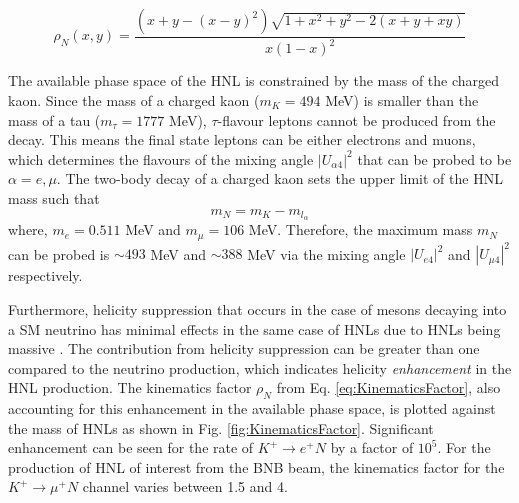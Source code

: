 \begin{equation}
	\rho_{N}(x,y) = \frac{(x+y-(x-y)^{2})\sqrt{1+x^{2}+y^{2}-2(x+y+xy)}}{x(1-x)^{2}}
\label{eq:KinematicsFactor}
\end{equation}


The available phase space of the HNL is constrained by the mass of the charged kaon.
Since the mass of a charged kaon ($m_{K} = 494 $ MeV) is smaller than the mass of a tau ($m_{\tau}=1777 $ MeV), $\tau$-flavour leptons cannot be produced from the decay.  
This means the final state leptons can be either electrons and muons, which determines the flavours of the mixing angle $|U_{\alpha4}|^{2}$ that can be probed to be $\alpha = e, \mu$.
The two-body decay of a charged kaon sets the upper limit of the HNL mass such that
\begin{equation}
	m_{N} = m_{K} - m_{l_{\alpha}}
\end{equation}
where, $m_{e}= 0.511 $ MeV and $m_{\mu}= 106 $ MeV.
Therefore, the maximum mass $m_{N}$ can be probed is $\sim493$ MeV  and $\sim388$ MeV via the mixing angle $|U_{e4}|^{2}$ and $|U_{\mu4}|^{2}$ respectively.

Furthermore, helicity suppression that occurs in the case of mesons decaying into a SM neutrino has minimal effects in the same case of HNLs due to HNLs being massive \cite{}.
The contribution from helicity suppression can be greater than one compared to the neutrino production, which indicates helicity \textit{enhancement} in the HNL production.
The kinematics factor $\rho_{N}$ from Eq. \ref{eq:KinematicsFactor}, also accounting for this enhancement in the available phase space, is plotted against the mass of HNLs as shown in Fig. \ref{fig:KinematicsFactor}.
Significant enhancement can be seen for the rate of $K^{+}\rightarrow e^{+}N$ by a factor of $10^{5}$.
For the production of HNL of interest from the BNB beam, the kinematics factor for the $K^{+}\rightarrow \mu^{+}N$ channel varies between 1.5 and 4.

